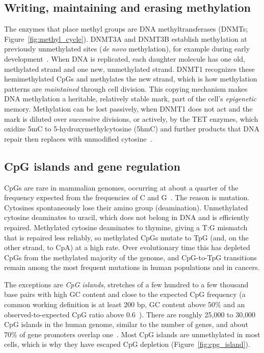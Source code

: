 \subsection{Writing, maintaining and erasing methylation}

The enzymes that place methyl groups are DNA methyltransferases (DNMTs; Figure~\ref{fig:methyl_cycle}). DNMT3A and DNMT3B establish methylation at previously unmethylated sites (\emph{de novo} methylation), for example during early development~\citep{okano1999}. When DNA is replicated, each daughter molecule has one old, methylated strand and one new, unmethylated strand. DNMT1 recognizes these hemimethylated CpGs and methylates the new strand, which is how methylation patterns are \emph{maintained} through cell division. This copying mechanism makes DNA methylation a heritable, relatively stable mark, part of the cell's \emph{epigenetic} memory. Methylation can be lost passively, when DNMT1 does not act and the mark is diluted over successive divisions, or actively, by the TET enzymes, which oxidize 5mC to 5-hydroxymethylcytosine (5hmC) and further products that DNA repair then replaces with unmodified cytosine~\citep{tahiliani2009}.

\subsection{CpG islands and gene regulation}

CpGs are rare in mammalian genomes, occurring at about a quarter of the frequency expected from the frequencies of C and G~\citep{bird1980}. The reason is mutation. Cytosines spontaneously lose their amino group (deamination). Unmethylated cytosine deaminates to uracil, which does not belong in DNA and is efficiently repaired. Methylated cytosine deaminates to thymine, giving a T:G mismatch that is repaired less reliably, so methylated CpGs mutate to TpG (and, on the other strand, to CpA) at a high rate. Over evolutionary time this has depleted CpGs from the methylated majority of the genome, and CpG-to-TpG transitions remain among the most frequent mutations in human populations and in cancers.

The exceptions are \emph{CpG islands}, stretches of a few hundred to a few thousand base pairs with high GC content and close to the expected CpG frequency (a common working definition is at least 200 bp, GC content above 50\% and an observed-to-expected CpG ratio above 0.6~\citep{gardinergarden1987}). There are roughly 25{,}000 to 30{,}000 CpG islands in the human genome, similar to the number of genes, and about 70\% of gene promoters overlap one~\citep{saxonov2006}. Most CpG islands are unmethylated in most cells, which is why they have escaped CpG depletion (Figure~\ref{fig:cpg_island}).

